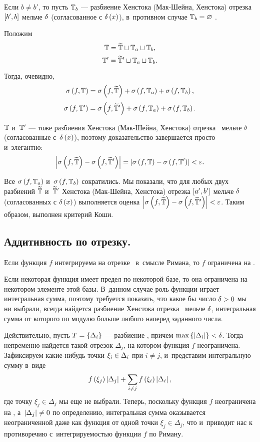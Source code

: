 \documentclass[draft]{article}
\begin{document}
\smallskip

Если $b\neq b'$, то пусть $\mathbb{T}_b$ --- разбиение Хенстока (Мак-Шейна,
Хенстока) отрезка $\seg[b',b]$ мельче $\delta$ (согласованное с
$\dex$), в~противном случае $\mathbb{T}_b=\varnothing$ .

\smallskip

Положим
$$\mathbb{T}=\widetilde{\mathbb{T}}\sqcup\mathbb{T}_a\sqcup\mathbb{T}_b,$$
$$\mathbb{T}'=\widetilde{\mathbb{T}}'\sqcup\mathbb{T}_a\sqcup\mathbb{T}_b.$$

Тогда, очевидно,
$$\isum(f,\T)=\isum(f,\Tt)+\isum(f,\T_a)+\isum(f,\T_b),$$
$$\isum(f,\T')=\isum(f,\Tt')+\isum(f,\T_a)+\isum(f,\T_b).$$

$\mathbb{T}$ и~$\mathbb{T}'$ --- тоже разбиения Хенстока (Мак-Шейна, Хенстока)
отрезка \ab\ мельче $\delta$ (согласованные с~$\dex$), поэтому
доказательство завершается просто и~элегантно:
$$\abs{\isum(f,\Tt)-\isum(f,\Tt')}=\abs{\isum(f,\T)-\isum(f,\T')}<\ep.$$

Все $\isum(f,\T_a)$ и~$\isum(f,\T_b)$ сократились. Мы показали, что
для любых двух разбиений $\widetilde{\mathbb{T}}$ и~$\widetilde{\mathbb{T}}'$ Хенстока (Мак-Шейна,
Хенстока) отрезка $\seg[a',b']$ мельче $\delta$ (согласованных с
$\dex$) выполняется оценка $\abs{\isum(f,\Tt)-\isum(f,\Tt')}<\ep$.
Таким образом, выполнен критерий Коши.

\prtm

\eject

\subsection{Аддитивность по отрезку.}


Если функция $f$ интегрируема на отрезке \ab\ в~смысле Римана, то
$f$ ограничена на \ab.

\pr

Если некоторая функция имеет предел по некоторой базе, то она
ограничена на некотором элементе этой базы. В~данном случае роль
функции играет интегральная сумма, поэтому требуется показать, что
какое бы число $\delta > 0$ мы ни выбрали, всегда найдется разбиение
Хенстока отрезка \ab\ мельче $\delta$, интегральная сумма от которого
по модулю больше любого наперед заданного числа.

\smallskip

Действительно, пусть $T=\left\{\Delta_i\right\}$ --- разбиение \ab, причем
$\max \left\{\left|\Delta_i\right|\right\}<\delta$. Тогда непременно найдется такой отрезок
$\Delta_j$, на котором функция $f$ неограничена. Зафиксируем
какие-нибудь точки $\xi_i\in\Delta_i$ при $i\neq j$, и~представим
интегральную сумму в~виде
$$f\at(\xi_j)\abs{\Delta_j}+\sum\limits_{i\neq j}\fxildi,$$
где точку $\xi_j\in\Delta_j$ мы еще не выбрали. Теперь, поскольку
функция $f$ неограничена на \ab, а~$\left|\Delta_j\right|\neq0$ по
определению, интегральная сумма оказывается неограниченной даже как
функция от одной точки $\xi_j\in\Delta_j$, что и~приводит нас к
противоречию с~интегрируемостью функции $f$ по Риману.
\end{document}
